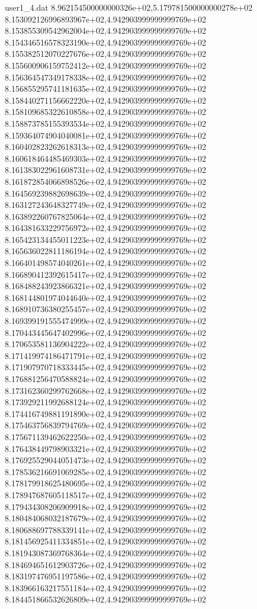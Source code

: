 \begin{filecontents}{user1_4.dat}
8.962154500000000326e+02,5.179781500000000278e+02
8.153092126996893967e+02,4.942903999999999769e+02
8.153855309542962004e+02,4.942903999999999769e+02
8.154346516578323190e+02,4.942903999999999769e+02
8.155382512070227676e+02,4.942903999999999769e+02
8.155600906159752412e+02,4.942903999999999769e+02
8.156364547349178338e+02,4.942903999999999769e+02
8.156855295741181635e+02,4.942903999999999769e+02
8.158440271156662220e+02,4.942903999999999769e+02
8.158109685322610858e+02,4.942903999999999769e+02
8.158873785155393534e+02,4.942903999999999769e+02
8.159364074904040081e+02,4.942903999999999769e+02
8.160402823262618313e+02,4.942903999999999769e+02
8.160618464485469303e+02,4.942903999999999769e+02
8.161383022961608731e+02,4.942903999999999769e+02
8.161872854066898526e+02,4.942903999999999769e+02
8.164569239882698639e+02,4.942903999999999769e+02
8.163127243648327749e+02,4.942903999999999769e+02
8.163892260767825064e+02,4.942903999999999769e+02
8.164381633229756972e+02,4.942903999999999769e+02
8.165423134455011223e+02,4.942903999999999769e+02
8.165636022811186194e+02,4.942903999999999769e+02
8.166401498574040261e+02,4.942903999999999769e+02
8.166890412392615417e+02,4.942903999999999769e+02
8.168488243923866321e+02,4.942903999999999769e+02
8.168144801974044640e+02,4.942903999999999769e+02
8.168910736380255457e+02,4.942903999999999769e+02
8.169399191555474999e+02,4.942903999999999769e+02
8.170443445647402996e+02,4.942903999999999769e+02
8.170653581136904222e+02,4.942903999999999769e+02
8.171419974186471791e+02,4.942903999999999769e+02
8.171907970718333445e+02,4.942903999999999769e+02
8.176881256470588824e+02,4.942903999999999769e+02
8.173162360299762668e+02,4.942903999999999769e+02
8.173929211992688124e+02,4.942903999999999769e+02
8.174416749881191890e+02,4.942903999999999769e+02
8.175463756839794769e+02,4.942903999999999769e+02
8.175671139462622250e+02,4.942903999999999769e+02
8.176438449798903321e+02,4.942903999999999769e+02
8.176925529044051473e+02,4.942903999999999769e+02
8.178536216691069285e+02,4.942903999999999769e+02
8.178179918625480695e+02,4.942903999999999769e+02
8.178947687605118517e+02,4.942903999999999769e+02
8.179434308206909918e+02,4.942903999999999769e+02
8.180484068032187679e+02,4.942903999999999769e+02
8.180688697788339141e+02,4.942903999999999769e+02
8.181456925411334851e+02,4.942903999999999769e+02
8.181943087369768364e+02,4.942903999999999769e+02
8.184694651612903726e+02,4.942903999999999769e+02
8.183197476951197586e+02,4.942903999999999769e+02
8.183966163217551184e+02,4.942903999999999769e+02
8.184451866532626809e+02,4.942903999999999769e+02

\end{filecontents}
